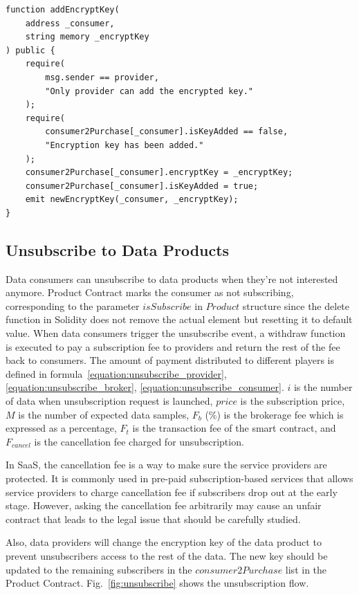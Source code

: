 \documentclass[conference]{IEEEtran}
\begin{document}
\lstset{style=solidity}

\begin{lstlisting}[caption={Add encryption key to data consumers}, label={lst:key_exchange}, frame=single]
function addEncryptKey(
    address _consumer,
    string memory _encryptKey
) public {
    require(
        msg.sender == provider,
        "Only provider can add the encrypted key."
    );
    require(
        consumer2Purchase[_consumer].isKeyAdded == false,
        "Encryption key has been added."
    );
    consumer2Purchase[_consumer].encryptKey = _encryptKey;
    consumer2Purchase[_consumer].isKeyAdded = true;
    emit newEncryptKey(_consumer, _encryptKey);
}
\end{lstlisting}

\subsection{Unsubscribe to Data Products}
Data consumers can unsubscribe to data products when they're not interested anymore. Product Contract marks the consumer as not subscribing, corresponding to the parameter $isSubscribe$ in $Product$ structure since the delete function in Solidity does not remove the actual element but resetting it to default value. When data consumers trigger the unsubscribe event, a withdraw function is executed to pay a subscription fee to providers and return the rest of the fee back to consumers. The amount of payment distributed to different players is defined in formula~\ref{equation:unsubscribe_provider}, \ref{equation:unsubscribe_broker}, \ref{equation:unsubscribe_consumer}. $i$ is the number of data when unsubscription request is launched, $price$  is the subscription price, $M$ is the number of expected data samples, $F_{b}$ (\%) is the brokerage fee which is expressed as a percentage, $F_{t}$ is the transaction fee of the smart contract, and $F_{cancel}$ is the cancellation fee charged for unsubscription.

In SaaS, the cancellation fee is a way to make sure the service providers are protected. It is commonly used in pre-paid subscription-based services that allows service providers to charge cancellation fee if subscribers drop out at the early stage. However, asking the cancellation fee arbitrarily may cause an unfair contract that leads to the legal issue that should be carefully studied.

Also, data providers will change the encryption key of the data product to prevent unsubscribers access to the rest of the data. The new key should be updated to the remaining subscribers in the $consumer2Purchase$ list in the Product Contract. Fig.~\ref{fig:unsubscribe} shows the unsubscription flow.
\end{document}
